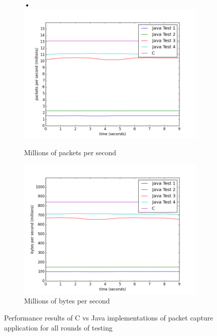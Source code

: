 \documentclass[final_report.tex]{subfiles}
\begin{document}
\begin{figure}[H]
	\centering
	\begin{subfigure}{0.5\textwidth}\textbf{•}
		\includegraphics[width=\textwidth]{../../data/pctest1/packets.png}
		\caption{Millions of packets per second}
		\label{fig:cappackets}
	\end{subfigure}%
	\begin{subfigure}{0.5\textwidth}
		\includegraphics[width=\textwidth]{../../data/pctest1/bytes.png}
		\caption{Millions of bytes per second}
		\label{fig:capbytes}
	\end{subfigure}
	\caption{Performance results of C vs Java implementations of packet capture application for all rounds of testing}
	\label{fig:cap}
\end{figure}
\end{document}
